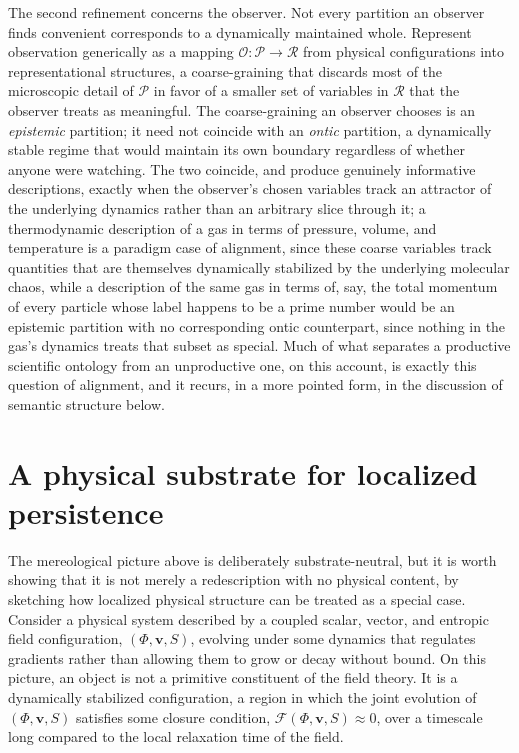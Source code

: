 \documentclass[11pt]{article}
\begin{document}
The second refinement concerns the observer. Not every partition an observer finds convenient corresponds to a dynamically maintained whole. Represent observation generically as a mapping $\mathcal{O}: \mathcal{P} \to \mathcal{R}$ from physical configurations into representational structures, a coarse-graining that discards most of the microscopic detail of $\mathcal{P}$ in favor of a smaller set of variables in $\mathcal{R}$ that the observer treats as meaningful. The coarse-graining an observer chooses is an \emph{epistemic} partition; it need not coincide with an \emph{ontic} partition, a dynamically stable regime that would maintain its own boundary regardless of whether anyone were watching. The two coincide, and produce genuinely informative descriptions, exactly when the observer's chosen variables track an attractor of the underlying dynamics rather than an arbitrary slice through it; a thermodynamic description of a gas in terms of pressure, volume, and temperature is a paradigm case of alignment, since these coarse variables track quantities that are themselves dynamically stabilized by the underlying molecular chaos, while a description of the same gas in terms of, say, the total momentum of every particle whose label happens to be a prime number would be an epistemic partition with no corresponding ontic counterpart, since nothing in the gas's dynamics treats that subset as special. Much of what separates a productive scientific ontology from an unproductive one, on this account, is exactly this question of alignment, and it recurs, in a more pointed form, in the discussion of semantic structure below.

\section{A physical substrate for localized persistence}

The mereological picture above is deliberately substrate-neutral, but it is worth showing that it is not merely a redescription with no physical content, by sketching how localized physical structure can be treated as a special case. Consider a physical system described by a coupled scalar, vector, and entropic field configuration, $(\Phi, \mathbf{v}, S)$, evolving under some dynamics that regulates gradients rather than allowing them to grow or decay without bound. On this picture, an object is not a primitive constituent of the field theory. It is a dynamically stabilized configuration, a region in which the joint evolution of $(\Phi, \mathbf{v}, S)$ satisfies some closure condition, $\mathcal{F}(\Phi, \mathbf{v}, S) \approx 0$, over a timescale long compared to the local relaxation time of the field.
\end{document}
